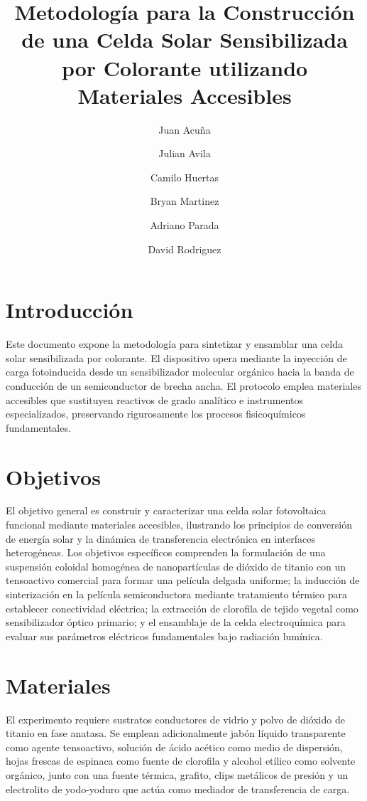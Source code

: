 \documentclass[11pt, a4paper]{article}
\title{Metodología para la Construcción de una Celda Solar Sensibilizada por
Colorante utilizando Materiales Accesibles}
\author{Juan Acuña \and Julian Avila \and Camilo Huertas
\and Bryan Martinez \and Adriano Parada \and David Rodriguez}
\date{}
\begin{document}
\maketitle

\section{Introducción}

Este documento expone la metodología para sintetizar y ensamblar una celda
solar sensibilizada por colorante. El dispositivo opera mediante la inyección
de carga fotoinducida desde un sensibilizador molecular orgánico hacia la banda
de conducción de un semiconductor de brecha ancha. El protocolo emplea
materiales accesibles que sustituyen reactivos de grado analítico e
instrumentos especializados, preservando rigurosamente los procesos
fisicoquímicos fundamentales.

\section{Objetivos}

El objetivo general es construir y caracterizar una celda solar fotovoltaica
funcional mediante materiales accesibles, ilustrando los principios de
conversión de energía solar y la dinámica de transferencia electrónica en
interfaces heterogéneas. Los objetivos específicos comprenden la formulación
de una suspensión coloidal homogénea de nanopartículas de dióxido de titanio
con un tensoactivo comercial para formar una película delgada uniforme; la
inducción de sinterización en la película semiconductora mediante tratamiento
térmico para establecer conectividad eléctrica; la extracción de clorofila de
tejido vegetal como sensibilizador óptico primario; y el ensamblaje de la
celda electroquímica para evaluar sus parámetros eléctricos fundamentales bajo
radiación lumínica.

\section{Materiales}

El experimento requiere sustratos conductores de vidrio y polvo de dióxido de
titanio en fase anatasa. Se emplean adicionalmente jabón líquido transparente
como agente tensoactivo, solución de ácido acético como medio de dispersión,
hojas frescas de espinaca como fuente de clorofila y alcohol etílico como
solvente orgánico, junto con una fuente térmica, grafito, clips metálicos de
presión y un electrolito de yodo-yoduro que actúa como mediador de
transferencia de carga.
\end{document}
